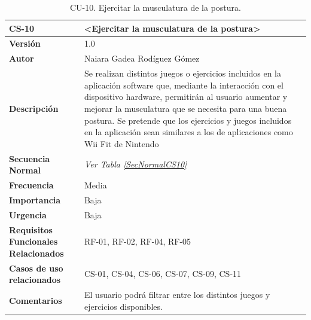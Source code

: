 \begin{table}[h!]
\centering
\begin{tabular}{ |m{3cm}|m{11cm}|  } 
\hline
\cellcolor[HTML]{B9E3F0}\textbf{CS-10} & \cellcolor[HTML]{B9E3F0}\textbf{<Ejercitar la musculatura de la postura>}\\

\hline
\cellcolor[HTML]{EFEFEF}\textbf{Versión}             & 1.0  \\
\hline
\cellcolor[HTML]{EFEFEF}\textbf{Autor}                & Naiara Gadea Rodíguez Gómez\\
\hline
\cellcolor[HTML]{EFEFEF}\textbf{Descripción}                & {Se realizan distintos juegos o ejercicios incluidos en la aplicación software que, mediante la interacción con el dispositivo hardware, permitirán al usuario aumentar y mejorar la musculatura que se necesita para una buena postura. Se pretende que los ejercicios y juegos incluidos en la aplicación sean similares a los de aplicaciones como Wii Fit de Nintendo \cite{WiiFit}}\\
\hline
\cellcolor[HTML]{EFEFEF}\textbf{Secuencia \newline Normal}                &        {\textit{Ver Tabla \ref{SecNormalCS10}}}       \\  
\hline
\cellcolor[HTML]{EFEFEF}\textbf{Frecuencia}                & Media\\
\hline
\cellcolor[HTML]{EFEFEF}\textbf{Importancia}                & Baja\\
\hline
\cellcolor[HTML]{EFEFEF}\textbf{Urgencia}                & Baja\\
\hline
\cellcolor[HTML]{EFEFEF}\textbf{Requisitos Funcionales Relacionados}                & {RF-01, RF-02, RF-04, RF-05 }\\
\hline
\cellcolor[HTML]{EFEFEF}\textbf{Casos de uso relacionados}                & {CS-01, CS-04, CS-06, CS-07, CS-09, CS-11}\\
\hline
\cellcolor[HTML]{EFEFEF}\textbf{Comentarios}                & {El usuario podrá filtrar entre los distintos juegos y ejercicios disponibles.}\\
\hline
\end{tabular}
\caption{CU-10. Ejercitar la musculatura de la postura.}
\end{table}

